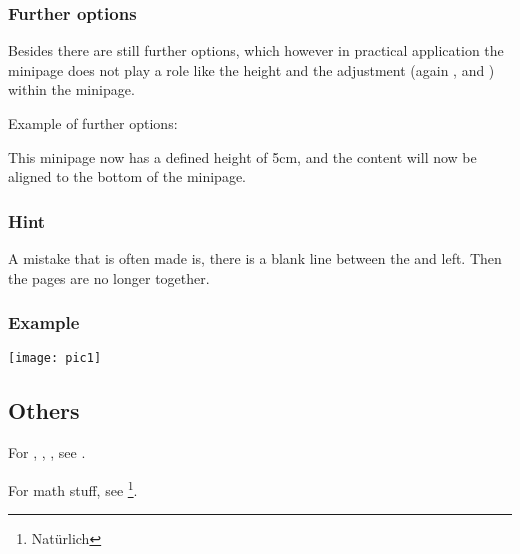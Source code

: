 \subsubsection{Further options}
Besides there are still further options, which however in practical application the minipage does not play a role like the height and the adjustment (again ,  and ) within the minipage.

Example of further options:

  This minipage now has a defined height of 5cm, and the content will now be aligned to the bottom of the minipage.
\subsubsection{Hint}

A mistake that is often made is, there is a blank line between the \code{\end{minipage}} and
\code{\begin{minipage}} left. Then the pages are no longer together.
  
\subsubsection{Example}
\begin{latex}
\begin{minipage}[t]{0.3\textwidth}
  \texttt{[image: pic1]}
\end{minipage}

\end{latex}

\subsection{Others}
For , , , see .

For math stuff, see \footnote{Natürlich}.

